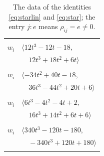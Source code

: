 \documentclass[11pt]{article}
\begin{document}
\begingroup\scriptsize
\setlength{\LTcapwidth}{\textwidth}
\begin{longtable}{@{}ll@{}}
\caption{The data of the identities \eqref{eq:starlin} and \eqref{eq:star}; the entry $j{:}e$ means $\rho_{ij}=e\neq0$.}\label{tab:star}\\
\hline\endfirsthead\hline\endhead\hline\endfoot
\multicolumn{2}{@{}p{0.97\textwidth}@{}}{$i=0$, $D_i=4$, $\rho_{ij}$: $7{:}1, \allowbreak 8{:}1, \allowbreak 10{:}2, \allowbreak 24{:}2, \allowbreak 29{:}2, \allowbreak 30{:}2, \allowbreak 43{:}2, \allowbreak 47{:}2, \allowbreak 48{:}2, \allowbreak 54{:}1, \allowbreak 57{:}1$}\\
$w_i$ & $\langle 12t^{3}-12t-18,$\\
 & $\quad 12t^{3}+18t^{2}+6t\rangle$\\
\addlinespace[2pt]
\multicolumn{2}{@{}p{0.97\textwidth}@{}}{$i=1$, $D_i=4$, $\rho_{ij}$: $24{:}2, \allowbreak 32{:}2, \allowbreak 35{:}1, \allowbreak 36{:}2, \allowbreak 47{:}2, \allowbreak 48{:}2, \allowbreak 51{:}1, \allowbreak 53{:}1, \allowbreak 54{:}1$}\\
$w_i$ & $\langle -34t^{2}+40t-18,$\\
 & $\quad 36t^{3}-44t^{2}+20t+6\rangle$\\
\addlinespace[2pt]
\multicolumn{2}{@{}p{0.97\textwidth}@{}}{$i=2$, $D_i=2$, $\rho_{ij}$: $20{:}1, \allowbreak 21{:}1, \allowbreak 22{:}1, \allowbreak 23{:}2, \allowbreak 24{:}1, \allowbreak 33{:}1, \allowbreak 40{:}2, \allowbreak 49{:}2, \allowbreak 53{:}1, \allowbreak 54{:}1$}\\
$w_i$ & $\langle 6t^{3}-4t^{2}-4t+2,$\\
 & $\quad 16t^{3}+14t^{2}+6t+6\rangle$\\
\addlinespace[2pt]
\multicolumn{2}{@{}p{0.97\textwidth}@{}}{$i=3$, $D_i=8$, $\rho_{ij}$: $5{:}1, \allowbreak 6{:}2, \allowbreak 7{:}1, \allowbreak 10{:}2, \allowbreak 14{:}1, \allowbreak 17{:}1, \allowbreak 18{:}1, \allowbreak 19{:}1, \allowbreak 22{:}1, \allowbreak 26{:}2, \allowbreak 40{:}2, \allowbreak 47{:}2, \allowbreak 48{:}1, \allowbreak 49{:}2, \allowbreak 54{:}1, \allowbreak 58{:}1$}\\
$w_i$ & $\langle 340t^{3}-120t-180,$\\
 & $\quad -340t^{3}+120t+180\rangle$\\
\addlinespace[2pt]
\multicolumn{2}{@{}p{0.97\textwidth}@{}}{$i=4$, $D_i=38$, $\rho_{ij}$: $6{:}1, \allowbreak 8{:}2, \allowbreak 18{:}2, \allowbreak 19{:}1, \allowbreak 22{:}1, \allowbreak 27{:}2, \allowbreak 36{:}2, \allowbreak 38{:}2, \allowbreak 40{:}2, \allowbreak 55{:}1$}\\

\end{longtable}
\end{document}
